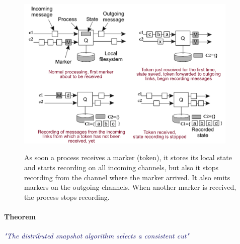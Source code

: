 \documentclass[10pt,a4paper]{article}
\begin{document}
\begin{figure}[h!]
 \hfill \includegraphics[width=300pt]{images/snap-marker.png}\hspace*{\fill}
  \label{fig:snap-marker}
  \caption{As soon a process receives a marker (token), it stores its local state and starts recording on all incoming channels, but also it stops recording from the channel where the marker arrived. It also emits markers on the outgoing channels. When another marker is received, the process stops recording.}
\end{figure} \pagebreak
\paragraph{Theorem}
\begin{description}
	\item \textcolor{MidnightBlue}{\textit{"The distributed snapshot algorithm selects a consistent cut"}}
\end{description}
\end{document}
